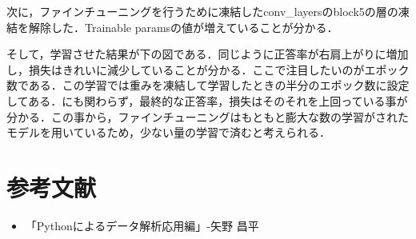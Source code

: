 \documentclass[uplatex,titlepage]{jsarticle}
\newif\iffigure
\begin{document}
次に，ファインチューニングを行うために凍結したconv\_layersのblock5の層の凍結を解除した．Trainable paramsの値が増えていることが分かる．\par
そして，学習させた結果が下の図である．同じように正答率が右肩上がりに増加し，損失はきれいに減少していることが分かる．ここで注目したいのがエポック数である．この学習では重みを凍結して学習したときの半分のエポック数に設定してある．にも関わらず，最終的な正答率，損失はそのそれを上回っている事が分かる．この事から，ファインチューニングはもともと膨大な数の学習がされたモデルを用いているため，少ない量の学習で済むと考えられる．
\iffigure
\begin{figure}[H]%
    \begin{center}
    \texttt{[image: finetyu\_after.png]} 
    \caption{凍結解除後のモデル}
    \end{center}
\end{figure}
\fi

\iffigure
\begin{figure}[H]
\begin{minipage}{8cm}%
  \begin{center}
   \texttt{[image: finetyu\_after\_acc.png]} \\
   \caption{凍結解除して学習したときの正答率の推移}
  \end{center}
\end{minipage}
\hfill
\begin{minipage}{8cm}%
  \begin{center}
    \texttt{[image: finetyu\_after\_loss.png]} \\
    \caption{凍結解除して学習したときの損失の推移}
  \end{center}
\end{minipage}
\end{figure}
\fi


\section{参考文献}
\begin{itemize}
  \item 「Pythonによるデータ解析応用編」-矢野 昌平
\end{itemize}
\end{document}
